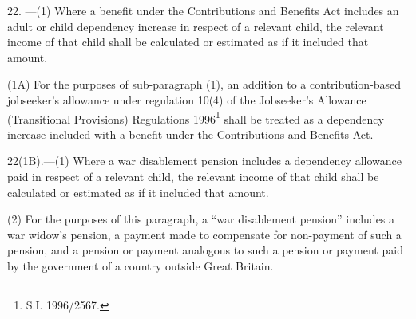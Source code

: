 \documentclass[12pt,a4paper]{article}
\begin{document}
\medskip

22.%
---(1)  %
  Where a benefit under the Contributions and Benefits Act includes an adult or child dependency increase in respect of a relevant child, the relevant income of that child shall be calculated or estimated as if it included that amount.

(1A) For the purposes of sub-paragraph (1), an addition to a contribution-based jobseeker’s allowance under 
regulation 10(4)  %
of the Jobseeker’s Allowance (Transitional Provisions) Regulations 
1996\footnote{\frenchspacing S.I. 1996/2567.}  %
shall be treated as a dependency increase included with a benefit under the Contributions and Benefits Act.


\medskip

22(1B).—(1) Where a war disablement pension includes a dependency allowance paid in respect of a relevant child, the relevant income of that child shall be calculated or estimated as if it included that amount.

(2) For the purposes of this paragraph, a “war disablement pension” includes a war widow’s pension, a payment made to compensate for non-payment of such a pension, and a pension or payment analogous to such a pension or payment paid by the government of a country outside Great Britain.


\medskip
\end{document}
